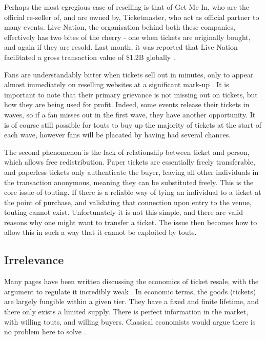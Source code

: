 \documentclass[12pt]{bhamdissertation}
\begin{document}
Perhaps the most egregious case of reselling is that of Get Me In, who are the official re-seller of, and are owned by, Ticketmaster, who act as official partner to many events. Live Nation, the organisation behind both these companies, effectively has two bites of the cherry - one when tickets are originally bought, and again if they are resold. Last month, it was reported that Live Nation facilitated a gross transaction value of \$1.2B globally \autocite{H16}.

Fans are understandably bitter when tickets sell out in minutes, only to appear almost immediately on reselling websites at a significant mark-up \autocite{Sa16}. It is important to note that their primary grievance is not missing out on tickets, but how they are being used for profit. Indeed, some events release their tickets in waves, so if a fan misses out in the first wave, they have another opportunity. It is of course still possible for touts to buy up the majority of tickets at the start of each wave, however fans will be placated by having had several chances.

The second phenomenon is the lack of relationship between ticket and person, which allows free redistribution. Paper tickets are essentially freely transferable, and paperless tickets only authenticate the buyer, leaving all other individuals in the transaction anonymous, meaning they can be substituted freely. This is the core issue of touting. If there is a reliable way of tying an individual to a ticket at the point of purchase, and validating that connection upon entry to the venue, touting cannot exist. Unfortunately it is not this simple, and there are valid reasons why one might want to transfer a ticket. The issue then becomes how to allow this in such a way that it cannot be exploited by touts.

\subsection{Irrelevance}

Many pages have been written discussing the economics of ticket resale, with the argument to regulate it incredibly weak \autocite{C03}. In economic terms, the goods (tickets) are largely fungible within a given tier. They have a fixed and finite lifetime, and there only exists a limited supply. There is perfect information in the market, with willing touts, and willing buyers. Classical economists would argue there is no problem here to solve \autocite{C00}.
\end{document}
